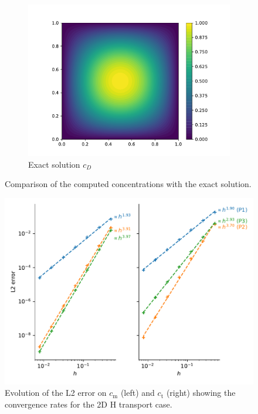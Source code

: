\begin{figure}
\begin{subfigure}{0.3\linewidth}
        \includegraphics[width=\linewidth]{Figures/Chapter2/c_exact.pdf}
        \caption{Exact solution $c_D$}
    \end{subfigure}
    \caption{Comparison of the computed concentrations with the exact solution.}
    \label{fig: results MMS 2D H transport}
\end{figure}

\begin{figure}
    \centering
    \includegraphics[width=\linewidth]{Figures/Chapter2/convergence_rate_H.pdf}
    \caption{Evolution of the L2 error on $c_\mathrm{m}$ (left) and $c_\mathrm{t}$ (right) showing the convergence rates for the 2D H transport case.}
    \label{fig: convergence rates H}
\end{figure}
